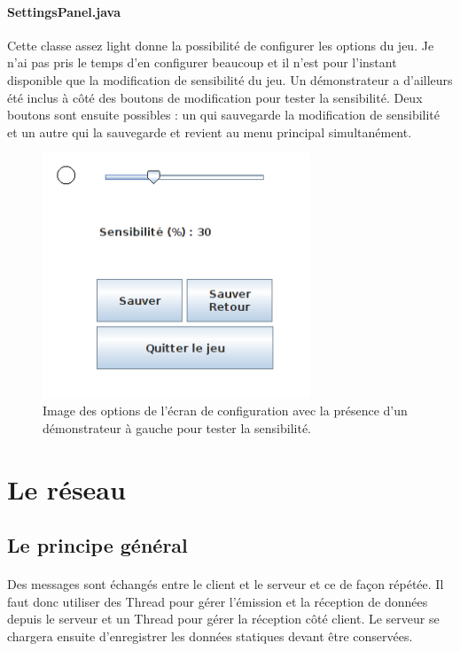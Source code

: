 \documentclass[a4paper,12pt]{report}
\begin{document}
\paragraph{SettingsPanel.java}
Cette classe assez light donne la possibilité de configurer les options du jeu. Je n'ai pas pris le temps d'en configurer beaucoup et il n'est pour l'instant disponible que la modification de sensibilité du jeu. Un démonstrateur a d'ailleurs été inclus à côté des boutons de modification pour tester la sensibilité. Deux boutons sont ensuite possibles : un qui sauvegarde la modification de sensibilité et un autre qui la sauvegarde et revient au menu principal simultanément.
\begin{figure}[H]
	\begin{center}
	\includegraphics[width=8cm]{pictures/settings.png} 
	\end{center}
	\caption{Image des options de l'écran de configuration avec la présence d'un démonstrateur à gauche pour tester la sensibilité.}
    \end{figure}

\section{Le réseau}
\subsection{Le principe général}
\paragraph{}
Des messages sont échangés entre le client et le serveur et ce de façon répétée. Il faut donc utiliser des Thread pour gérer l'émission et la réception de données depuis le serveur et un Thread pour gérer la réception côté client. Le serveur se chargera ensuite d'enregistrer les données statiques devant être conservées.
\end{document}
